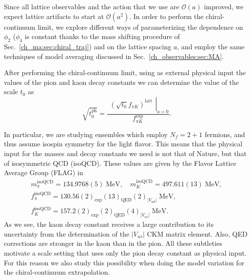Since all lattice observables and the action that we use are $\mathcal{O}(a)$ improved, we expect lattice artifacts to start at $\mathcal{O}(a^2)$. In order to perform the chiral-continuum limit, we explore different ways of parameterizing the dependence on $\phi_2$ ($\phi_4$ is constant thanks to the mass shifting procedure of Sec.~\ref{ch_ma:sec:chiral_traj}) and on the lattice spacing $a$, and employ the same techniques of model averaging discussed in Sec.~\ref{ch_observables:sec:MA}.

After performing the chiral-continuum limit, using as external physical input the values of the pion and kaon decay constants we can determine the value of the scale $t_0$ as
\begin{equation}
\sqrt{t_0^{\textrm{ph}}}=\frac{\left.\begin{matrix}
\left(\sqrt{t_0}f_{\pi K}\right)^{\textrm{latt}}
\end{matrix}\right|_{a=0}}{f_{\pi K}^{\textrm{exp}}}.
\end{equation}

In particular, we are studying ensembles which employ $N_f=2+1$ fermions, and thus assume isospin symmetry for the light flavor. This means that the physical input for the masses and decay constants we need is not that of Nature, but that of isosymmetric QCD (isoQCD). These values are given by the Flavor Lattice Average Group (FLAG) in~\citep{FlavourLatticeAveragingGroupFLAG:2021npn}
\begin{gather}
\label{ch_ss:eq:isoQCD}
m_{\pi}^{\textrm{isoQCD}}=134.9768(5)\;{\textrm{MeV}}, \quad
m_{K}^{\textrm{isoQCD}}=497.611(13)\;{\textrm{MeV}}, \\
f_{\pi}^{\textrm{isoQCD}}=130.56(2)_{\textrm{exp}}(13)_{\textrm{QED}}(2)_{|V_{ud}|}\;{\textrm{MeV}}, \quad \\
f_{K}^{\textrm{isoQCD}}=157.2(2)_{\textrm{exp}}(2)_{\textrm{QED}}(4)_{|V_{us}|}\;{\textrm{MeV}}.
\end{gather} 
As we see, the kaon decay constant receives a large contribution to its uncertainty from the determination of the $|V_{us}|$ CKM matrix element. Also, QED corrections are stronger in the kaon than in the pion. All these subtleties motivate a scale setting that uses only the pion decay constant as physical input. For this reason we also study this possibility when doing the model variation for the chiral-continuum extrapolation.



